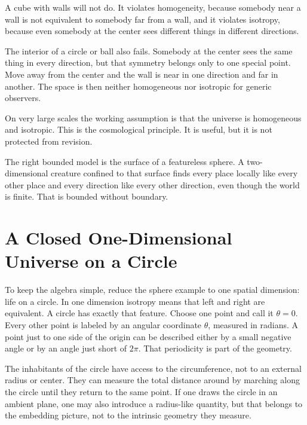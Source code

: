 A cube with walls will not do. It violates homogeneity, because somebody near a wall is not equivalent to somebody far from a wall, and it violates isotropy, because even somebody at the center sees different things in different directions.

The interior of a circle or ball also fails. Somebody at the center sees the same thing in every direction, but that symmetry belongs only to one special point. Move away from the center and the wall is near in one direction and far in another. The space is then neither homogeneous nor isotropic for generic observers.

On very large scales the working assumption is that the universe is homogeneous and isotropic. This is the cosmological principle. It is useful, but it is not protected from revision.

\begin{classroomqa}
\end{classroomqa}

The right bounded model is the surface of a featureless sphere. A two-dimensional creature confined to that surface finds every place locally like every other place and every direction like every other direction, even though the world is finite. That is bounded without boundary.

\section{A Closed One-Dimensional Universe on a Circle}

To keep the algebra simple, reduce the sphere example to one spatial dimension: life on a circle. In one dimension isotropy means that left and right are equivalent. A circle has exactly that feature. Choose one point and call it \(\theta=0\). Every other point is labeled by an angular coordinate \(\theta\), measured in radians. A point just to one side of the origin can be described either by a small negative angle or by an angle just short of \(2\pi\). That periodicity is part of the geometry.

The inhabitants of the circle have access to the circumference, not to an external radius or center. They can measure the total distance around by marching along the circle until they return to the same point. If one draws the circle in an ambient plane, one may also introduce a radius-like quantity, but that belongs to the embedding picture, not to the intrinsic geometry they measure.

